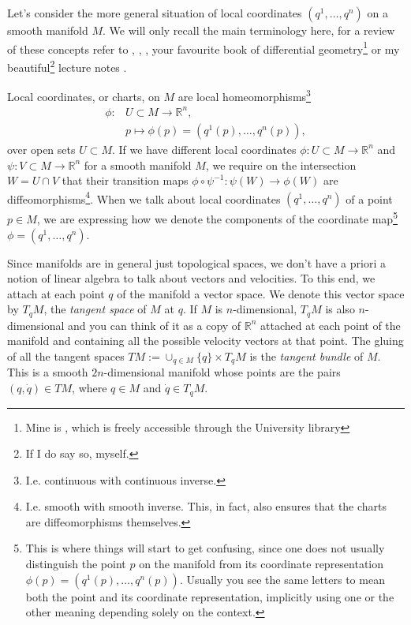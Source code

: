 \documentclass[english,fontsize=11pt,paper=b5]{scrbook}
\theoremstyle{definition}
\begin{document}
    Let's consider the more general situation of local coordinates $(q^1, \ldots, q^n)$ on a smooth manifold $M$.
    We will only recall the main terminology here, for a review of these concepts refer to \cite[Chapter 4.18]{book:arnold}, \cite[Appendix A]{book:knauf}, \cite[Chapter 4]{book:marsdenratiu}, your favourite book of differential geometry\footnote{Mine is \cite{book:lee}, which is freely accessible through the University library} or my beautiful\footnote{If I do say so, myself.} lecture notes \cite{lectures:aom:seri}.

    Local coordinates, or charts, on $M$ are local homeomorphisms\footnote{I.e. continuous with continuous inverse.}
    \begin{align}
      \phi: & U\subset M\to \mathbb{R}^n, \\
            & p \mapsto \phi(p) = (q^1(p), \ldots, q^n(p)),
    \end{align}
    over open sets $U\subset M$. If we have different local coordinates $\phi:U\subset M\to\mathbb{R}^n$ and $\psi:V\subset M\to\mathbb{R}^n$ for a smooth manifold $M$, we require on the intersection $W=U\cap V$ that their transition maps $\phi\circ\psi^{-1}:\psi(W)\to\phi(W)$ are diffeomorphisms\footnote{I.e. smooth with smooth inverse. This, in fact, also ensures that the charts are diffeomorphisms themselves.}.
    When we talk about local coordinates $(q^1,\ldots,q^n)$ of a point $p\in M$, we are expressing how we denote the components of the coordinate map\footnote{This is where things will start to get confusing, since one does not usually distinguish the point $p$ on the manifold from its coordinate representation $\phi(p)=(q^1(p), \ldots, q^n(p))$. Usually you see the same letters to mean both the point and its coordinate representation, implicitly using one or the other meaning depending solely on the context.} $\phi=(q^1, \ldots, q^n)$.

    Since manifolds are in general just topological spaces, we don't have a priori a notion of linear algebra to talk about vectors and velocities.
    To this end, we attach at each point $q$ of the manifold a vector space.
    We denote this vector space by $T_q M$, the \emph{tangent space} of $M$ at $q$.
    If $M$ is $n$-dimensional, $T_q M$ is also $n$-dimensional and you can think of it as a copy of $\mathbb{R}^n$ attached at each point of the manifold and containing all the possible velocity vectors at that point.
    The gluing of all the tangent spaces $TM := \cup_{q\in M}\{q\}\times T_q M$ is the \emph{tangent bundle} of $M$. This is a smooth $2n$-dimensional manifold whose points are the pairs $(q,\dot q)\in TM$, where $q\in M$ and $\dot q\in T_q M$.
\end{document}
